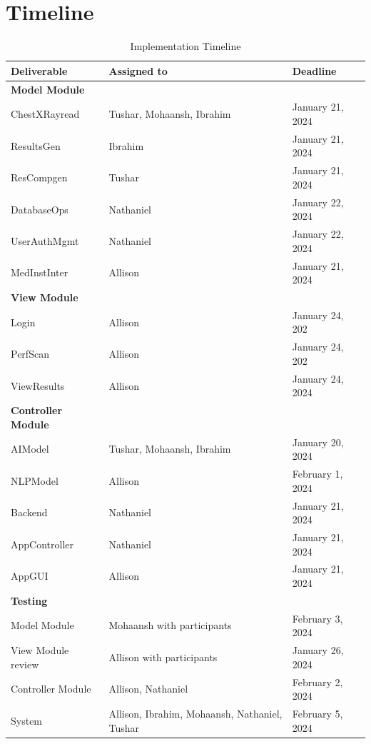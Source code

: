 \documentclass[12pt, titlepage]{article}
\begin{document}
\section{Timeline}
\begin{table}
    \begin{tabular}{l l l} 
    \toprule		
    \textbf{Deliverable} & \textbf{Assigned to} & \textbf{Deadline}\\
    \midrule 
    \textbf{Model Module} & \\
    \midrule
    ChestXRayread & Tushar, Mohaansh, Ibrahim & January 21, 2024 \\
    ResultsGen & Ibrahim & January 21, 2024\\
    ResCompgen & Tushar & January 21, 2024\\
    DatabaseOps & Nathaniel & January 22, 2024\\
    UserAuthMgmt & Nathaniel & January 22, 2024\\
    MedInstInter & Allison & January 21, 2024 \\
    \midrule
    \textbf{View Module} \\
    \midrule
    Login & Allison & January 24, 202 \\
    PerfScan & Allison & January 24, 202\\
    ViewResults & Allison & January 24, 2024 \\
    \midrule
    \textbf{Controller Module} \\
    \midrule
    AIModel & Tushar, Mohaansh, Ibrahim & January 20, 2024\\
    NLPModel & Allison & February 1, 2024\\
    Backend & Nathaniel & January 21, 2024\\
    AppController & Nathaniel & January 21, 2024\\
    AppGUI & Allison & January 21, 2024\\
    \midrule
    \textbf{Testing} \\
    \midrule
    Model Module & Mohaansh with participants & February 3, 2024 \\
    View Module review & Allison with participants & January 26, 2024 \\
    Controller Module & Allison, Nathaniel & February 2, 2024  \\
    System & Allison, Ibrahim, Mohaansh, Nathaniel, Tushar & February 5, 2024 \\
    \bottomrule
    \end{tabular}\\
    \caption{Implementation Timeline}
    \label{table:Timeline}
\end{table}
\end{document}
